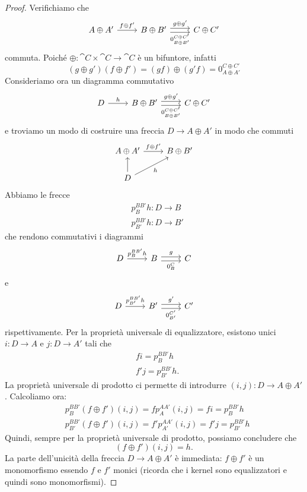 \begin{proof}
  Verifichiamo che
  \[
    \begin{tikzcd}
      A \oplus A' \ar["{f \oplus f'}", r] & B \oplus B' \ar["{g \oplus
        g'}", r, shift left] \ar["{0_{B \oplus B'}^{C \oplus C'}}", r,
      shift right, swap] & C \oplus C'
    \end{tikzcd}
  \]
  commuta. Poiché \(\oplus : \cat C \times \cat C \to \cat C\) è un
  bifuntore, infatti
  \[
    (g \oplus g') (f \oplus f') = (g f) \oplus (g' f) = 0_{A \oplus
      A'}^{C \oplus C'}
  \]
  Consideriamo ora un diagramma commutativo
  \[
    \begin{tikzcd}
      D \ar["{h}", r] & B \oplus B' \ar["{g \oplus g'}", r, shift left]
      \ar["{0_{B \oplus B'}^{C \oplus C'}}", r, shift right, swap] & C
      \oplus C'
    \end{tikzcd}
  \]
  e troviamo un modo di costruire una freccia \(D \to A \oplus A'\) in
  modo che commuti
  \[
    \begin{tikzcd}
      A \oplus A' \ar["{f \oplus f'}", r] & B \oplus B' \\
      D \ar["{h}", ur, swap] \ar["{}", u]
    \end{tikzcd}
  \]
  Abbiamo le frecce
  \begin{align*}
    & p_B^{BB'} h : D \to B \\
    & p_{B'}^{BB'} h : D \to B'
  \end{align*}
  che rendono commutativi i diagrammi
  \[
    \begin{tikzcd}
      D \ar["{p_B^{BB'} h}", r] & B \ar["{g}", r, shift left]
      \ar["{0_B^C}", r, shift right, swap] & C
    \end{tikzcd}
  \]
  e
  \[
    \begin{tikzcd}
      D \ar["{p_{B'}^{BB'} h}", r] & B' \ar["{g'}", r, shift left]
      \ar["{0_{B'}^{C'}}", r, shift right, swap] & C'
    \end{tikzcd}
  \]
  rispettivamente. Per la proprietà universale di equalizzatore,
  esistono unici \(i : D \to A\) e \(j : D \to A'\) tali che
  \begin{align*}
    & f i = p_B^{BB'} h \\
    & f' j = p_{B'}^{BB'} h .
  \end{align*}
  La proprietà universale di prodotto ci permette di introdurre
  \((i,j) : D \to A \oplus A'\).  Calcoliamo ora:
  \begin{align*}
    & p_B^{BB'} (f \oplus f') (i,j) = f p_A^{AA'} (i,j) = f i = p_B^{BB'} h \\
    & p_{B'}^{BB'} (f \oplus f') (i,j) = f' p_{A'}^{AA'} (i,j) = f' j = p_{B'}^{BB'} h
  \end{align*}
  Quindi, sempre per la proprietà universale di prodotto, possiamo
  concludere che
  \[
    (f \oplus f') (i,j) = h.
  \]
  La parte dell'unicità della freccia \(D \to A \oplus A'\) è immediata:
  \(f \oplus f'\) è un monomorfismo essendo \(f\) e \(f'\) monici
  (ricorda che i kernel sono equalizzatori e quindi sono monomorfismi).
\end{proof}



